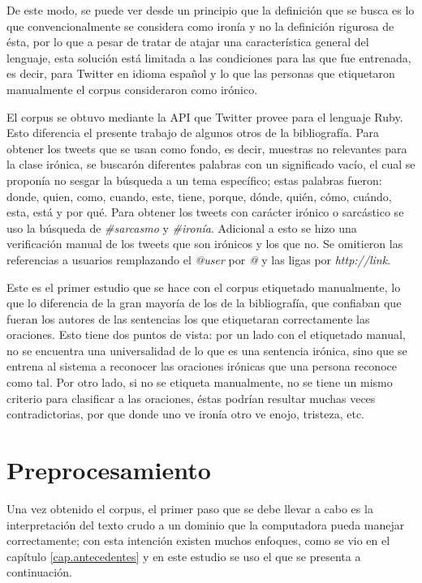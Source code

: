 \par De este modo, se puede ver desde un principio que la definición que se busca es lo que convencionalmente se considera como ironía y no la definición rigurosa de ésta, por lo que a pesar de tratar de atajar una característica general del lenguaje, esta solución está limitada a las condiciones para las que fue entrenada, es decir, para Twitter en idioma español y lo que las personas que etiquetaron manualmente el corpus consideraron como irónico.

\par El corpus se obtuvo mediante la API que Twitter provee para el lenguaje Ruby. Esto diferencia el presente trabajo de algunos otros de la bibliografía. Para obtener los tweets que se usan como fondo, es decir, muestras no relevantes para la clase irónica, se buscarón diferentes palabras con un significado vacío, el cual se proponía no sesgar la búsqueda a un tema específico; estas palabras fueron: donde, quien, como, cuando, este, tiene, porque, dónde, quién, cómo, cuándo, esta, está y por qué. Para obtener los tweets con carácter irónico o sarcástico se uso la búsqueda de \textit{ \#sarcasmo} y \textit{\#ironía}. Adicional a esto se hizo una verificación manual de los tweets que son irónicos y los que no. Se omitieron las referencias a usuarios remplazando el \textit{@user} por \textit{@} y las ligas por \textit{http://link}.

\par Este es el primer estudio que se hace con el corpus etiquetado manualmente, lo que lo diferencia de la gran mayoría de los de la bibliografía, que confiaban que fueran los autores de las sentencias los que etiquetaran correctamente las oraciones. Esto tiene dos puntos de vista: por un lado con el etiquetado manual, no se encuentra una universalidad de lo que es una sentencia irónica, sino que se entrena al sistema a reconocer las oraciones irónicas que una persona reconoce como tal. Por otro lado, si no se etiqueta manualmente, no se tiene un mismo criterio para clasificar a las oraciones, éstas podrían resultar muchas veces contradictorias, por que donde uno ve ironía otro ve enojo, tristeza, etc.

\section{Preprocesamiento}
\par Una vez obtenido el corpus, el primer paso que se debe llevar a cabo es la interpretación del texto crudo a un dominio que la computadora pueda manejar correctamente; con esta intención existen muchos enfoques, como se vio en el capítulo \ref{cap.antecedentes} y en este estudio se uso el que se presenta a continuación.
